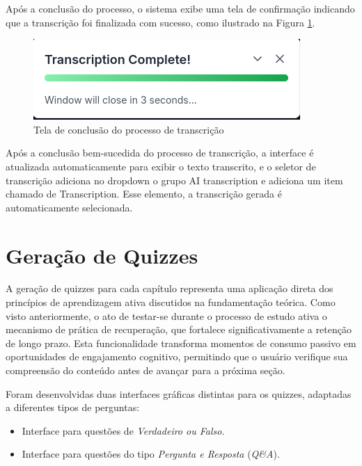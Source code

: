 \documentclass[tcc,capa]{texufpel}
\begin{document}
Após a conclusão do processo, o sistema exibe uma tela de confirmação indicando que a transcrição foi finalizada com sucesso, como ilustrado na Figura \ref{fig:completed-transcription}.

\begin{figure}[H]
  \centering
  \includegraphics[width=\textwidth,height=0.45\textheight,keepaspectratio]{exemplo-slides/graphics/images/completed-transcription.png}
  \caption{Tela de conclusão do processo de transcrição}
  \label{fig:completed-transcription}
\end{figure}

Após a conclusão bem-sucedida do processo de transcrição, a interface é atualizada automaticamente para exibir o texto transcrito, e o seletor de transcrição adiciona no dropdown o grupo AI transcription e adiciona um item chamado de Transcription. Esse elemento, a transcrição gerada é automaticamente selecionada.
\section{Gera\c{c}\~ao de Quizzes}

A gera\c{c}\~ao de quizzes para cada cap\'{i}tulo representa uma aplica\c{c}\~ao direta dos princ\'{i}pios de aprendizagem ativa discutidos na fundamenta\c{c}\~ao te\'orica. Como visto anteriormente, o ato de testar-se durante o processo de estudo ativa o mecanismo de pr\'atica de recupera\c{c}\~ao, que fortalece significativamente a reten\c{c}\~ao de longo prazo. Esta funcionalidade transforma momentos de consumo passivo em oportunidades de engajamento cognitivo, permitindo que o usu\'ario verifique sua compreens\~ao do conte\'udo antes de avan\c{c}ar para a pr\'oxima se\c{c}\~ao.

Foram desenvolvidas duas interfaces gr\'aficas distintas para os quizzes, adaptadas a diferentes tipos de perguntas:

\begin{itemize}
  \item Interface para questões de \textit{Verdadeiro ou Falso}.
  \item Interface para quest\~oes do tipo \textit{Pergunta e Resposta} (\textit{Q\&A}).
\end{itemize}
\end{document}
